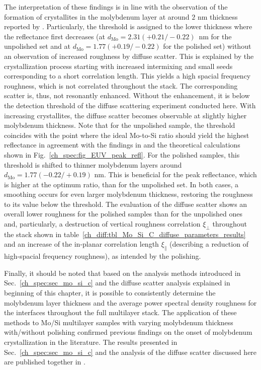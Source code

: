 The interpretation of these findings is in line with the observation of the formation of crystallites in the molybdenum layer at around $2$ nm thickness reported by \textcite{bajt_investigation_2001}. Particularly, the threshold is assigned to the lower thickness where the reflectance first decreases (at $d_\text{Mo}=2.31(+0.21/-0.22)$~nm for the unpolished set and at $d_\text{Mo}=1.77(+0.19/-0.22)$ for the polished set) without an observation of increased roughness by diffuse scatter. This is explained by the crystallization process starting with increased intermixing and small seeds corresponding to a short correlation length. This yields a high spacial frequency roughness, which is not correlated throughout the stack. The corresponding scatter is, thus, not resonantly enhanced. Without the enhancement, it is below the detection threshold of the diffuse scattering experiment conducted here. With increasing crystallites, the diffuse scatter becomes observable at slightly higher molybdenum thickness. Note that for the unpolished sample, the threshold coincides with the point where the ideal Mo-to-Si ratio should yield the highest reflectance in agreement with the findings in \cite{bajt_investigation_2001} and the theoretical calculations shown in Fig.~\ref{ch_spec:fig_EUV_peak_refl}. For the polished samples, this threshold is shifted to thinner molybdenum layers around $d_\text{Mo} = 1.77(-0.22/+0.19)$ nm. This is beneficial for the peak reflectance, which is higher at the optimum ratio, than for the unpolished set. In both cases, a smoothing occurs for even larger molybdenum thickness, restoring the roughness to its value below the threshold. The evaluation of the diffuse scatter shows an overall lower roughness for the polished samples than for the unpolished ones and, particularly, a destruction of vertical roughness correlation $\xi_\perp$ throughout the stack shown in table~\ref{ch_diff:tbl_Mo_Si_C_diffuse_parameters_results} and an increase of the in-planar correlation length $\xi_\parallel$ (describing a reduction of high-spacial frequency roughness), as intended by the polishing. 

Finally, it should be noted that based on the analysis methods introduced in Sec.~\ref{ch_spec:sec_mo_si_c} and the diffuse scatter analysis explained in beginning of this chapter, it is possible to consistently determine the molybdenum layer thickness and the average power spectral density roughness for the interfaces throughout the full multilayer stack. The application of these methods to Mo/Si multilayer samples with varying molybdenum thickness with/without polishing confirmed previous findings on the onset of molybdenum crystallization in the literature. The results presented in Sec.~\ref{ch_spec:sec_mo_si_c} and the analysis of the diffuse scatter discussed here are published together in .

